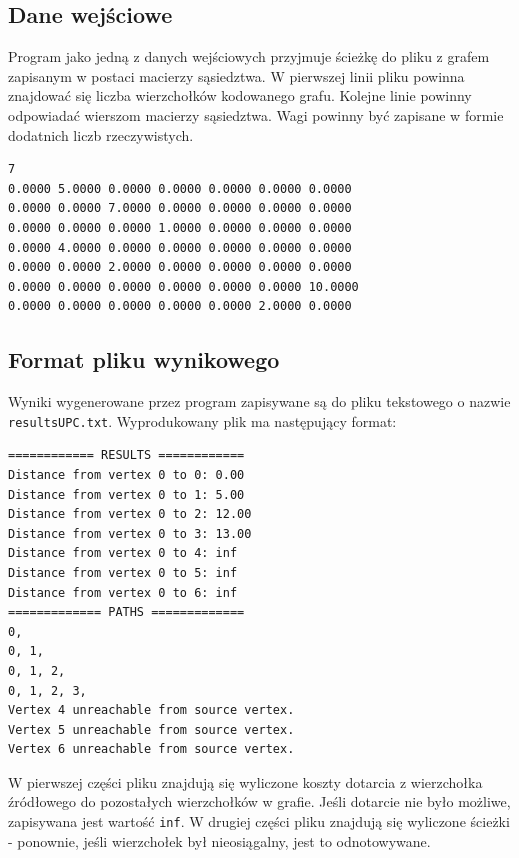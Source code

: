 \documentclass[12pt]{article}
\begin{document}
\subsection{Dane wejściowe}
Program jako jedną z danych wejściowych przyjmuje ścieżkę do pliku z grafem zapisanym w postaci macierzy sąsiedztwa. W pierwszej linii pliku powinna znajdować się liczba wierzchołków kodowanego grafu. Kolejne linie powinny odpowiadać wierszom macierzy sąsiedztwa. Wagi powinny być zapisane w formie dodatnich liczb rzeczywistych.

\begin{lstlisting}[caption={Przykładowy plik wejściowy.}]
7
0.0000 5.0000 0.0000 0.0000 0.0000 0.0000 0.0000
0.0000 0.0000 7.0000 0.0000 0.0000 0.0000 0.0000
0.0000 0.0000 0.0000 1.0000 0.0000 0.0000 0.0000
0.0000 4.0000 0.0000 0.0000 0.0000 0.0000 0.0000
0.0000 0.0000 2.0000 0.0000 0.0000 0.0000 0.0000
0.0000 0.0000 0.0000 0.0000 0.0000 0.0000 10.0000
0.0000 0.0000 0.0000 0.0000 0.0000 2.0000 0.0000
\end{lstlisting}


\subsection{Format pliku wynikowego}
Wyniki wygenerowane przez program zapisywane są do pliku tekstowego o nazwie \lstinline{resultsUPC.txt}. Wyprodukowany plik ma następujący format:
\begin{lstlisting}[caption={Przykładowy plik z wynikami}]
============ RESULTS ============
Distance from vertex 0 to 0: 0.00 
Distance from vertex 0 to 1: 5.00 
Distance from vertex 0 to 2: 12.00 
Distance from vertex 0 to 3: 13.00 
Distance from vertex 0 to 4: inf 
Distance from vertex 0 to 5: inf 
Distance from vertex 0 to 6: inf 
============= PATHS =============
0, 
0, 1, 
0, 1, 2, 
0, 1, 2, 3, 
Vertex 4 unreachable from source vertex.
Vertex 5 unreachable from source vertex.
Vertex 6 unreachable from source vertex.
\end{lstlisting}
W pierwszej części pliku znajdują się wyliczone koszty dotarcia z wierzchołka źródłowego do pozostałych wierzchołków w grafie. Jeśli dotarcie nie było możliwe, zapisywana jest wartość \lstinline{inf}. W drugiej części pliku znajdują się wyliczone ścieżki - ponownie, jeśli wierzchołek był nieosiągalny, jest to odnotowywane.
\end{document}
